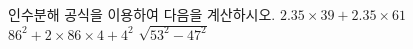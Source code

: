 인수분해 공식을 이용하여 다음을 계산하시오.
 $2.35\times39+2.35\times61$
 $86^2+2\times86\times4+4^2$
 $\sqrt{53^2-47^2}$
